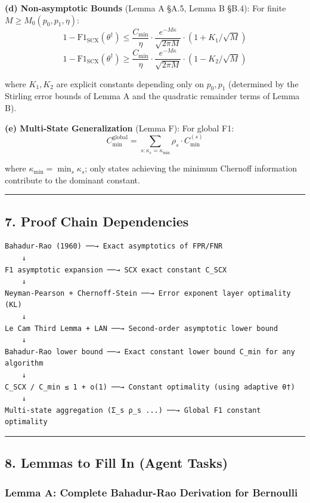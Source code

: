 \documentclass[
  12pt,
]{ctexart}
\begin{document}
\textbf{(d) Non-asymptotic Bounds} (Lemma A §A.5, Lemma B §B.4): For finite \(M \geq M_0(p_0, p_1, \eta)\):
\[1 - \text{F1}_{\text{SCX}}(\theta^\dagger) \leq \frac{C_{\min}}{\eta} \cdot \frac{e^{-M\kappa}}{\sqrt{2\pi M}} \cdot (1 + K_1/\sqrt{M})\]
\[1 - \text{F1}_{\text{SCX}}(\theta^\dagger) \geq \frac{C_{\min}}{\eta} \cdot \frac{e^{-M\kappa}}{\sqrt{2\pi M}} \cdot (1 - K_2/\sqrt{M})\]

where \(K_1, K_2\) are explicit constants depending only on \(p_0, p_1\) (determined by the Stirling error bounds of Lemma A and the quadratic remainder terms of Lemma B).

\textbf{(e) Multi-State Generalization} (Lemma F): For global F1:
\[C_{\min}^{\text{global}} = \sum_{s: \kappa_s = \kappa_{\min}} \rho_s \cdot C_{\min}^{(s)}\]

where \(\kappa_{\min} = \min_s \kappa_s\); only states achieving the minimum Chernoff information contribute to the dominant constant.

\begin{center}\rule{0.5\linewidth}{0.5pt}\end{center}

\subsection{7. Proof Chain Dependencies}\label{proof-chain-dependencies}

\begin{verbatim}
Bahadur-Rao (1960) ──→ Exact asymptotics of FPR/FNR
    ↓
F1 asymptotic expansion ──→ SCX exact constant C_SCX
    ↓
Neyman-Pearson + Chernoff-Stein ──→ Error exponent layer optimality (KL)
    ↓
Le Cam Third Lemma + LAN ──→ Second-order asymptotic lower bound
    ↓
Bahadur-Rao lower bound ──→ Exact constant lower bound C_min for any algorithm
    ↓
C_SCX / C_min ≤ 1 + o(1) ──→ Constant optimality (using adaptive θ†)
    ↓
Multi-state aggregation (Σ_s ρ_s ...) ──→ Global F1 constant optimality
\end{verbatim}

\begin{center}\rule{0.5\linewidth}{0.5pt}\end{center}

\subsection{8. Lemmas to Fill In (Agent Tasks)}\label{lemmas-to-fill-in-agent-tasks}

\subsubsection{Lemma A: Complete Bahadur-Rao Derivation for Bernoulli}\label{lemma-a-complete-bahadur-rao-derivation-for-bernoulli}
\end{document}
